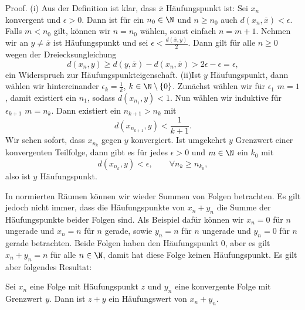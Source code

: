 \documentclass[letterpaper,10pt,english]{jupyterBook}
\begin{document}
\begin{emphBox}{}{}
Proof.  (i) Aus der Definition ist klar, dass \(\overline{x}\) Häufungspunkt ist: Sei \(x_n\) konvergent und \(\epsilon > 0\). Dann ist für ein \(n_0 \in \N\) und \(n \geq n_0\) auch \(d(x_n, \overline{x}) < \epsilon\). Falls \(m < n_0\) gilt, können wir \(n=n_0\) wählen, sonst einfach \(n=m+1\). Nehmen wir an \(y \neq \overline{x}\) ist Häufungspunkt und sei \(\epsilon < \frac{d(\overline{x},y)}2\). Dann gilt für alle \(n \geq 0\) wegen der Dreiecksungleichung
\begin{equation*}
 d(x_n,y) \geq d(y,\overline{x}) - d(x_n,\overline{x}) > 2 \epsilon - \epsilon = \epsilon,
\end{equation*}
ein Widerspruch zur Häufungspunkteigenschaft.
(ii)Ist \(y\) Häufungspunkt, dann wählen wir hintereinander \(\epsilon_k = \frac{1}k\), \(k \in \N \setminus \{0\}\). Zunächst wählen wir für \(\epsilon_1\) \(m=1\), damit existiert ein \(n_1\), sodass \(d(x_{n_1},y) < 1\). Nun wählen wir induktive für \(\epsilon_{k+1}\)  \(m=n_k\). Dann existiert ein \(n_{k+1} > n_k\) mit
\begin{equation*}
 d(x_{n_{k+1}},y) < \frac{1}{k+1}.
\end{equation*}
Wir sehen sofort, dass \(x_{n_k}\) gegen \(y\) konvergiert.
Ist umgekehrt \(y\) Grenzwert einer konvergenten Teilfolge, dann gibt es für jedes \(\epsilon >0 \) und \(m \in \N\) ein \(k_0 \) mit
\begin{equation*}
 d(x_{n_k},y) < \epsilon, \qquad \forall n_k \geq n_{k_0},
\end{equation*}
also ist \(y\) Häufungspunkt.
\end{emphBox}

In normierten Räumen können wir wieder Summen von Folgen betrachten. Es gilt jedoch nicht immer, dass die Häufungspunkte von \(x_n+y_n\) die Summe der Häufungspunkte beider Folgen sind. Als Beispiel dafür können wir \(x_n=0\) für \(n\) ungerade und \(x_n=n\) für \(n\) gerade, sowie \(y_n=n\) für \(n\) ungerade und \(y_n=0\) für \(n\) gerade betrachten. Beide Folgen haben den Häufungspunkt \(0\), aber es gilt \(x_n+y_n = n\) für alle \(n \in \N\), damit hat diese Folge keinen Häufungspunkt. Es gilt aber folgendes Resultat:
\label{metrik/teilfolgen:lemma-4}
\begin{lemma}{}{}



Sei \(x_n\) eine Folge mit Häufungspunkt \(z\) und \(y_n\) eine konvergente Folge mit Grenzwert \(y\). Dann ist \(z+y\) ein Häufungswert von \(x_n + y_n\).
\end{lemma}
\end{document}
